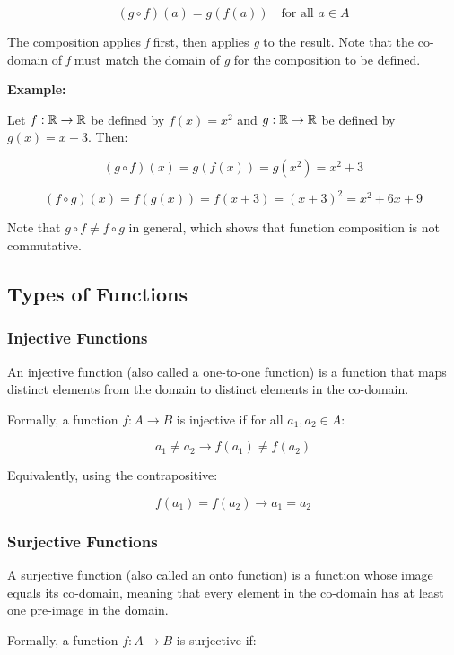 \[
	(g \circ f)(a) = g(f(a)) \quad \text{for all } a \in A
\]

The composition applies \emph{f} first, then applies \emph{g} to the result. 
Note that the co-domain of \emph{f} must match the domain of \emph{g} for the composition to be defined.
\vspace{\baselineskip}

\textbf{Example:}
\vspace{\baselineskip}

Let \(f: \mathbb{R} \to \mathbb{R}\) be defined by \(f(x) = x^2\) and \(g: \mathbb{R} \rightarrow \mathbb{R}\) be defined 
by \(g(x) = x+3\). Then:

\[
	(g \circ f)(x) = g(f(x)) = g(x^2) = x^2 + 3
\]

\[
	(f \circ g)(x) = f(g(x)) = f(x+3) = {(x+3)}^2 = x^2 + 6x + 9
\]

Note that \(g \circ f \neq f \circ g\) in general, which shows that function composition is not 
commutative.

\subsection{Types of Functions}

\subsubsection{Injective Functions}

An injective function (also called a one-to-one function) is a 
function that maps distinct elements from the domain to distinct elements in the co-domain.

Formally, a function \(f: A \to B\) is injective if for all \(a_1, a_2 \in A\):

\[
	a_1 \neq a_2 \to f(a_1) \neq f(a_2)
\]

Equivalently, using the contrapositive:

\[
	f(a_1) = f(a_2) \to a_1 = a_2
\]

\subsubsection{Surjective Functions}

A surjective function (also called an onto function) is a function whose image equals its co-domain, 
meaning that every element in the co-domain has at least one pre-image in the domain.

Formally, a function \(f: A \to B\) is surjective if:

